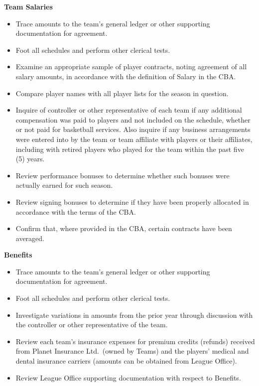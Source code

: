 \documentclass[
]{book}
\providecommand{\tightlist}{%
  \setlength{\itemsep}{0pt}\setlength{\parskip}{0pt}}
\begin{document}
\textbf{Team Salaries}

\begin{itemize}
\tightlist
\item
  Trace amounts to the team's general ledger or other supporting documentation for agreement.
\item
  Foot all schedules and perform other clerical tests.
\item
  Examine an appropriate sample of player contracts, noting agreement of all salary amounts, in accordance with the definition of Salary in the CBA.
\item
  Compare player names with all player lists for the season in question.
\item
  Inquire of controller or other representative of each team if any additional compensation was paid to players and not included on the schedule, whether or not paid for basketball services. Also inquire if any business arrangements were entered into by the team or team affiliate with players or their affiliates, including with retired players who played for the team within the past five (5) years.
\item
  Review performance bonuses to determine whether such bonuses were actually earned for such season.
\item
  Review signing bonuses to determine if they have been properly allocated in accordance with the terms of the CBA.
\item
  Confirm that, where provided in the CBA, certain contracts have been averaged.
\end{itemize}

\textbf{Benefits}

\begin{itemize}
\tightlist
\item
  Trace amounts to the team's general ledger or other supporting documentation for agreement.
\item
  Foot all schedules and perform other clerical tests.
\item
  Investigate variations in amounts from the prior year through discussion with the controller or other representative of the team.
\item
  Review each team's insurance expenses for premium credits (refunds) received from Planet Insurance Ltd.~(owned by Teams) and the players' medical and dental insurance carriers (amounts can be obtained from League Office).
\item
  Review League Office supporting documentation with respect to Benefits.
\end{itemize}
\end{document}
